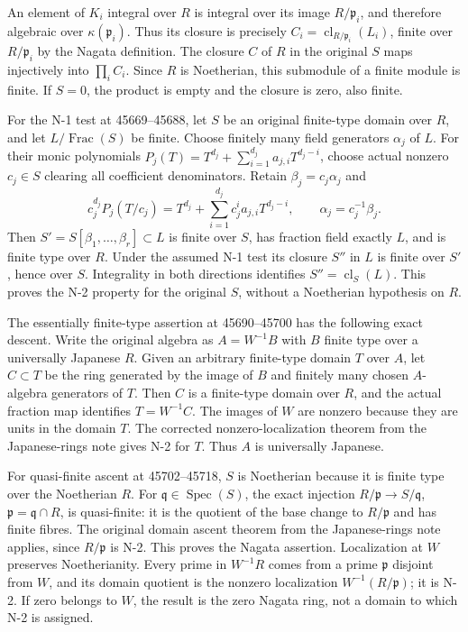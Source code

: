 An element of \(K_i\) integral over \(R\) is integral over its image \(R/\mathfrak p_i\), and therefore algebraic over \(\kappa(\mathfrak p_i)\). Thus its closure is precisely \(C_i=\operatorname{cl}_{R/\mathfrak p_i}(L_i)\), finite over \(R/\mathfrak p_i\) by the Nagata definition. The closure \(C\) of \(R\) in the original \(S\) maps injectively into \(\prod_i C_i\). Since \(R\) is Noetherian, this submodule of a finite module is finite. If \(S=0\), the product is empty and the closure is zero, also finite.

For the N-1 test at 45669--45688, let \(S\) be an original finite-type domain over \(R\), and let \(L/\operatorname{Frac}(S)\) be finite. Choose finitely many field generators \(\alpha_j\) of \(L\). For their monic polynomials \(P_j(T)=T^{d_j}+\sum_{i=1}^{d_j}a_{j,i}T^{d_j-i}\), choose actual nonzero \(c_j\in S\) clearing all coefficient denominators. Retain \(\beta_j=c_j\alpha_j\) and \[
 c_j^{d_j}P_j(T/c_j)
 =T^{d_j}+\sum_{i=1}^{d_j}c_j^i a_{j,i}T^{d_j-i},
 \qquad \alpha_j=c_j^{-1}\beta_j.
\] Then \(S'=S[\beta_1,\ldots,\beta_r]\subset L\) is finite over \(S\), has fraction field exactly \(L\), and is finite type over \(R\). Under the assumed N-1 test its closure \(S''\) in \(L\) is finite over \(S'\), hence over \(S\). Integrality in both directions identifies \(S''=\operatorname{cl}_S(L)\). This proves the N-2 property for the original \(S\), without a Noetherian hypothesis on \(R\).

The essentially finite-type assertion at 45690--45700 has the following exact descent. Write the original algebra as \(A=W^{-1}B\) with \(B\) finite type over a universally Japanese \(R\). Given an arbitrary finite-type domain \(T\) over \(A\), let \(C\subset T\) be the ring generated by the image of \(B\) and finitely many chosen \(A\)-algebra generators of \(T\). Then \(C\) is a finite-type domain over \(R\), and the actual fraction map identifies \(T=W^{-1}C\). The images of \(W\) are nonzero because they are units in the domain \(T\). The corrected nonzero-localization theorem from the Japanese-rings note gives N-2 for \(T\). Thus \(A\) is universally Japanese.

For quasi-finite ascent at 45702--45718, \(S\) is Noetherian because it is finite type over the Noetherian \(R\). For \(\mathfrak q\in\operatorname{Spec}(S)\), the exact injection \(R/\mathfrak p\to S/\mathfrak q\), \(\mathfrak p=\mathfrak q\cap R\), is quasi-finite: it is the quotient of the base change to \(R/\mathfrak p\) and has finite fibres. The original domain ascent theorem from the Japanese-rings note applies, since \(R/\mathfrak p\) is N-2. This proves the Nagata assertion. Localization at \(W\) preserves Noetherianity. Every prime in \(W^{-1}R\) comes from a prime \(\mathfrak p\) disjoint from \(W\), and its domain quotient is the nonzero localization \(W^{-1}(R/\mathfrak p)\); it is N-2. If zero belongs to \(W\), the result is the zero Nagata ring, not a domain to which N-2 is assigned.

